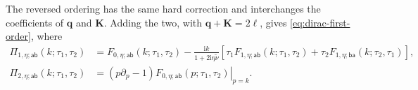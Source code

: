 \documentclass[a4paper,12pt]{article}
\newcommand{\ii}{\mathrm i}
\newcommand{\mb}{\mathbf}
\newcommand{\tn}{\tilde\nu}
\def\aa{\mathsf a}
\newcommand{\bb}{\mathsf b}
\newcommand{\di}{\mathrm d}
\begin{document}
The reversed ordering has the same hard correction and interchanges
the coefficients of $\mb q$ and $\mb K$. Adding the two, with
$\mb q+\mb K=2\bm\ell$, gives \eqref{eq:dirac-first-order}, where
\begin{align}
 \Pi_{1,\eta;\aa\bb}(k;\tau_1,\tau_2)
 &=F_{0,\eta;\aa\bb}(k;\tau_1,\tau_2)
 -\frac{\ii k}{1+2\ii\eta\tn}
 [\tau_1F_{1,\eta;\aa\bb}(k;\tau_1,\tau_2)
  +\tau_2F_{1,\eta;\bb\aa}(k;\tau_2,\tau_1)],\nonumber\\
 \Pi_{2,\eta;\aa\bb}(k;\tau_1,\tau_2)
 &=\left.(p\partial_p-1)F_{0,\eta;\aa\bb}(p;\tau_1,\tau_2)\right|_{p=k}.
 \label{eq:dirac-Pi}
\end{align}




\end{document}
